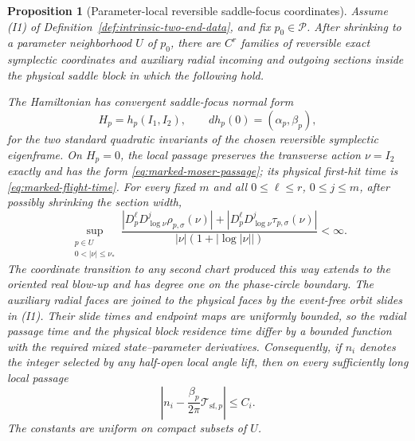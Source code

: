 \documentclass[11pt]{amsart}
\numberwithin{equation}{section}
\newtheorem{proposition}[theorem]{Proposition}
\theoremstyle{definition}
\theoremstyle{remark}
\begin{document}
\begin{proposition}[Parameter-local reversible saddle-focus coordinates]
\label{prop:local-reversible-moser-passage}
Assume \textup{(I1)} of
Definition~\ref{def:intrinsic-two-end-data}, and fix $p_0\in\mathcal P$.
After shrinking to a parameter neighborhood $U$ of $p_0$, there are
$C^r$ families of reversible exact symplectic coordinates and auxiliary
radial incoming and outgoing sections inside the physical saddle block in
which the following hold.

The Hamiltonian has convergent saddle-focus normal form
\begin{equation}\label{eq:parametric-moser-normal-form}
 H_p=h_p(I_1,I_2),\qquad
 dh_p(0)=(\alpha_p,\beta_p),
\end{equation}
for the two standard quadratic invariants of the chosen reversible
symplectic eigenframe.  On $H_p=0$, the local passage preserves the
transverse action $\nu=I_2$ exactly and has the form
\eqref{eq:marked-moser-passage}; its physical first-hit time is
\eqref{eq:marked-flight-time}.  For every fixed $m$ and all
$0\le\ell\le r$, $0\le j\le m$, after possibly shrinking the section
width,
\begin{equation}\label{eq:parametric-moser-weighted-bounds}
 \sup_{\substack{p\in U\\0<|\nu|\le\nu_*}}
 \frac{|D_p^\ell D_{\log\nu}^j\rho_{p,\sigma}(\nu)|
       +|D_p^\ell D_{\log\nu}^j\tau_{p,\sigma}(\nu)|}
      {|\nu|(1+|\log|\nu||)}<\infty .
\end{equation}
The coordinate transition to any second chart produced this way extends to
the oriented real blow-up and has degree one on the phase-circle boundary.
The auxiliary radial faces are joined to the physical faces by the
event-free orbit slides in \textup{(I1)}.  Their slide times and endpoint
maps are uniformly bounded, so the radial passage time and the physical
block residence time differ by a bounded function with the required mixed
state--parameter derivatives.
Consequently, if $n_i$ denotes the integer selected by any half-open local
angle lift, then on every sufficiently long local passage
\begin{equation}\label{eq:winding-residence-comparison}
 \left|n_i-\frac{\beta_p}{2\pi}
          \mathcal T_{\mathrm{sf},p}\right|\le C_i .
\end{equation}
The constants are uniform on compact subsets of $U$.
\end{proposition}
\end{document}
